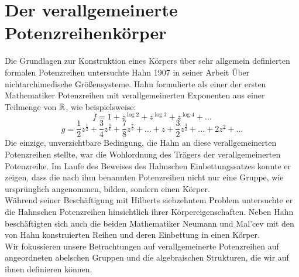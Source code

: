 %
% 
%
%
%
%
%
\section{Der verallgemeinerte Potenzreihenkörper}
%
Die Grundlagen zur Konstruktion eines Körpers über sehr allgemein definierten formalen Potenzreihen untersuchte Hahn 1907 in seiner Arbeit \glqq Über nichtarchimedische Größensysteme\grqq. 
Hahn formulierte als einer der ersten Mathematiker Potenzreihen mit verallgemeinerten Exponenten aus einer Teilmenge von $\mathbb{R}$, wie beispielsweise:\\
\[ f = 1 + z^{\log 2} + z^{\log 3} + z^{\log 4} + ... \]
\[g = \frac{1}{2}z^{\frac{1}{2}} + \frac{3}{4}z^\frac{3}{4} + \frac{7}{8}z^\frac{7}{8} + ... + z + \frac{3}{2}z^\frac{3}{2} + ... + 2z^2 + ...\] 
Die einzige, unverzichtbare Bedingung, die Hahn an diese verallgemeinerten Potenzreihen stellte, war die Wohlordnung des Trägers der verallgemeinerten Potenzreihe.
Im Laufe des Beweises des Hahnschen Einbettungssatzes konnte er zeigen, dass die nach ihm benannten Potenzreihen nicht nur eine Gruppe, wie ursprünglich angenommen, bilden, sondern einen Körper. \\ Während seiner Beschäftigung mit Hilberts siebzehntem Problem untersuchte er die Hahnschen Potenzreihen hinsichtlich ihrer Körpereigenschaften. Neben Hahn beschäftigten sich auch die beiden Mathematiker Neumann und Mal'cev mit den von Hahn konstruierten Reihen und deren Einbettung in einen Körper. \\
Wir fokussieren unsere Betrachtungen auf verallgemeinerte Potenzreihen auf angeordneten abelschen Gruppen und die algebraischen Strukturen, die wir auf ihnen definieren können. 

